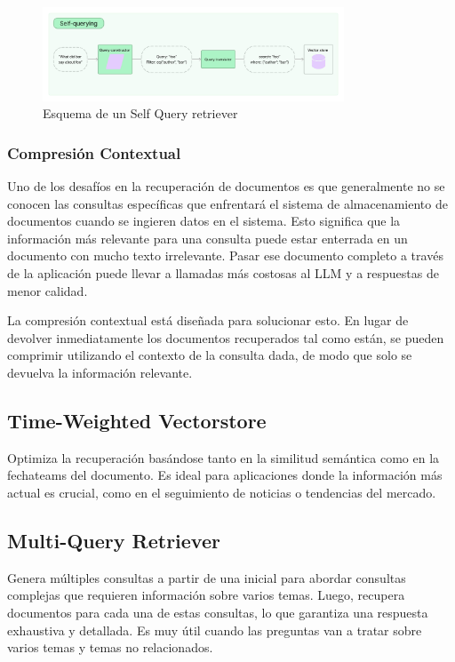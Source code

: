 \begin{figure}[h]
\centering
\includegraphics[width=0.8\textwidth]{figuras/capitulo5/self_query.jpg}
\caption{Esquema de un Self Query retriever \citep{langchainretrievers}}
\label{fig:retrieverselfquery}
\end{figure}


\subsubsection{Compresión Contextual}

Uno de los desafíos en la recuperación de documentos es que generalmente no se conocen las consultas específicas que enfrentará el sistema de almacenamiento de documentos cuando se ingieren datos en el sistema. Esto significa que la información más relevante para una consulta puede estar enterrada en un documento con mucho texto irrelevante. Pasar ese documento completo a través de la aplicación puede llevar a llamadas más costosas al LLM y a respuestas de menor calidad.

La compresión contextual está diseñada para solucionar esto. En lugar de devolver inmediatamente los documentos recuperados tal como están, se pueden comprimir utilizando el contexto de la consulta dada, de modo que solo se devuelva la información relevante.


\subsection{Time-Weighted Vectorstore}

Optimiza la recuperación basándose tanto en la similitud semántica como en la fechateams del documento. Es ideal para aplicaciones donde la información más actual es crucial, como en el seguimiento de noticias o tendencias del mercado.

\subsection{Multi-Query Retriever}

Genera múltiples consultas a partir de una inicial para abordar consultas complejas que requieren información sobre varios temas. Luego, recupera documentos para cada una de estas consultas, lo que garantiza una respuesta exhaustiva y detallada. Es muy útil cuando las preguntas van a tratar sobre varios temas y temas no relacionados.

